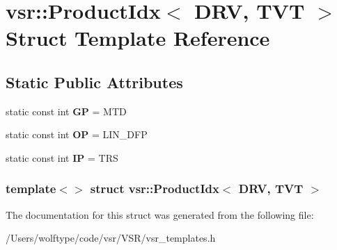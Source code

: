 \hypertarget{structvsr_1_1_product_idx_3_01_d_r_v_00_01_t_v_t_01_4}{\section{vsr\-:\-:Product\-Idx$<$ D\-R\-V, T\-V\-T $>$ Struct Template Reference}
\label{structvsr_1_1_product_idx_3_01_d_r_v_00_01_t_v_t_01_4}
}
\subsection*{Static Public Attributes}
\begin{DoxyCompactItemize}
\item 
\hypertarget{structvsr_1_1_product_idx_3_01_d_r_v_00_01_t_v_t_01_4_a770b3128f12f25e27896964511cdb9b2}{static const int {\bfseries G\-P} = M\-T\-D}\label{structvsr_1_1_product_idx_3_01_d_r_v_00_01_t_v_t_01_4_a770b3128f12f25e27896964511cdb9b2}

\item 
\hypertarget{structvsr_1_1_product_idx_3_01_d_r_v_00_01_t_v_t_01_4_a050539800025e13a56af55c86edf7a6f}{static const int {\bfseries O\-P} = L\-I\-N\-\_\-\-D\-F\-P}\label{structvsr_1_1_product_idx_3_01_d_r_v_00_01_t_v_t_01_4_a050539800025e13a56af55c86edf7a6f}

\item 
\hypertarget{structvsr_1_1_product_idx_3_01_d_r_v_00_01_t_v_t_01_4_a04683357e1749960fefe26e4b000308e}{static const int {\bfseries I\-P} = T\-R\-S}\label{structvsr_1_1_product_idx_3_01_d_r_v_00_01_t_v_t_01_4_a04683357e1749960fefe26e4b000308e}

\end{DoxyCompactItemize}
\subsubsection*{template$<$$>$ struct vsr\-::\-Product\-Idx$<$ D\-R\-V, T\-V\-T $>$}



The documentation for this struct was generated from the following file\-:\begin{DoxyCompactItemize}
\item 
/\-Users/wolftype/code/vsr/\-V\-S\-R/vsr\-\_\-templates.\-h\end{DoxyCompactItemize}
